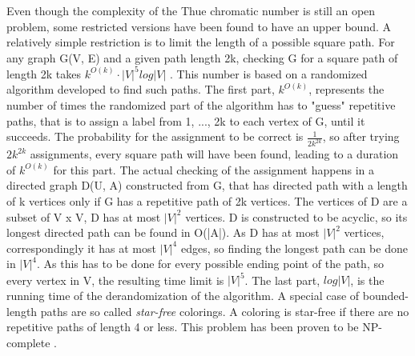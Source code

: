 \documentclass[12pt,a4paper]{article}
\begin{document}
Even though the complexity of the Thue chromatic number is still an open problem, some restricted versions have been found to have an upper bound. A relatively simple restriction is to limit the length of a possible square path. For any graph G(V, E) and a given path length 2k, checking G for a square path of length 2k takes $k^{O(k)} \cdot |V|^5 log |V|$ \citep{Marx2009}. This number is based on a randomized algorithm developed to find such paths. The first part, $k^{O(k)}$, represents the number of times the randomized part of the algorithm has to "guess" repetitive paths, that is to assign a label from {1, ..., 2k} to each vertex of G, until it succeeds. The probability for the assignment to be correct is $\frac{1}{2k^{2k}}$, so after trying $2k^{2k}$ assignments, every square path will have been found, leading to a duration of $k^{O(k)}$ for this part. The actual checking of the assignment happens in a directed graph D(U, A) constructed from G, that has directed path with a length of k vertices only if G has a repetitive path of 2k vertices. The vertices of D are a subset of V x V, D has at most $|V|^2$ vertices. D is constructed to be acyclic, so its longest directed path can be found in O(|A|). As D has at most $|V|^2$ vertices, correspondingly it has at most $|V|^4$ edges, so finding the longest path can be done in $|V|^4$. As this has to be done for every possible ending point of the path, so every vertex in V, the resulting time limit is $|V|^5$. The last part, $log |V|$, is the running time of the derandomization of the algorithm. 
\newline
A special case of bounded-length paths are so called \textit{star-free} colorings. A coloring is star-free if there are no repetitive paths of length 4 or less. This problem has been proven to be NP-complete \citep{Coleman1984}.
\newline
\end{document}
